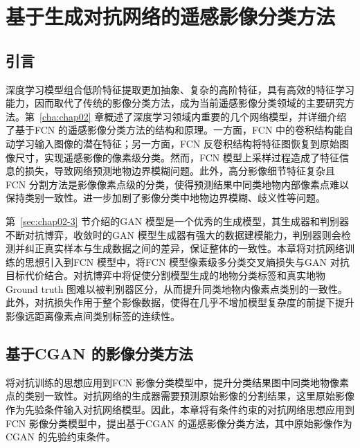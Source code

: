 
\chapter{基于生成对抗网络的遥感影像分类方法}
\label{cha:chap03}

\section{引言}
深度学习模型组合低阶特征提取更加抽象、复杂的高阶特征，具有高效的特征学习能力，因而取代了传统的影像分类方法，成为当前遥感影像分类领域的主要研究方法。第~\ref{cha:chap02} 章概述了深度学习领域内重要的几个网络模型，并详细介绍了基于FCN 的遥感影像分类方法的结构和原理。一方面，FCN 中的卷积结构能自动学习输入图像的潜在特征；另一方面，FCN 反卷积结构将特征图恢复到原始图像尺寸，实现遥感影像的像素级分类。然而，FCN 模型上采样过程造成了特征信息的损失，导致网络预测地物边界模糊问题。此外，高分影像细节特征复杂且FCN 分割方法是影像像素点级的分类，使得预测结果中同类地物内部像素点难以保持类别一致性。进一步加剧了影像分类中地物边界模糊、歧义性等问题。


第~\ref{sec:chap02-3} 节介绍的GAN 模型是一个优秀的生成模型，其生成器和判别器不断对抗博弈，收敛时的GAN 模型生成器有强大的数据建模能力，判别器则会检测并纠正真实样本与生成数据之间的差异，保证整体的一致性。本章将对抗网络训练的思想引入到FCN 模型中，将FCN 模型像素级多分类交叉熵损失与GAN 对抗目标代价结合。对抗博弈中将促使分割模型生成的地物分类标签和真实地物Ground truth 图难以被判别器区分，从而提升同类地物内像素点类别的一致性。此外，对抗损失作用于整个影像数据，使得在几乎不增加模型复杂度的前提下提升影像远距离像素点间类别标签的连续性。


\section{基于CGAN 的影像分类方法}
\label{sec:firtst}

将对抗训练的思想应用到FCN 影像分类模型中，提升分类结果图中同类地物像素点的类别一致性。对抗网络的生成器需要预测原始影像的分割结果，这里原始影像作为先验条件输入对抗网络模型。因此，本章将有条件约束的对抗网络思想应用到FCN 影像分类模型中，提出基于CGAN 的遥感影像分类方法，其中原始影像作为CGAN 的先验约束条件。


